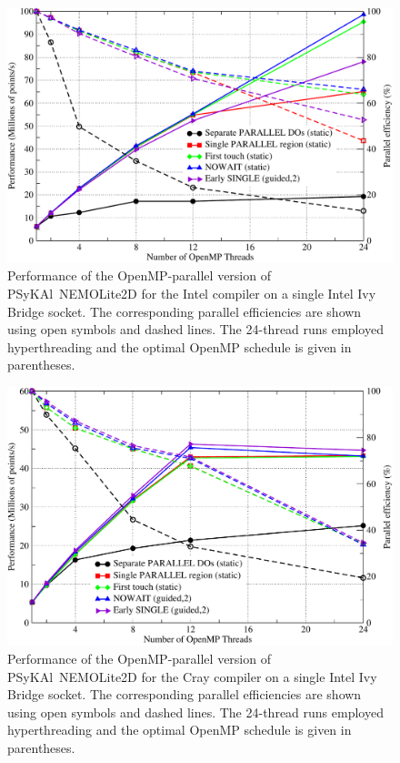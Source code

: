 \documentclass[journal]{IEEEtran}
\newlength{\picwidth}
\newcommand{\psykal}{{PS}y{KA}l}
\begin{document}
\begin{figure}
\centering
\includegraphics[width=\picwidth]{omp_scaling_256_intel}
\caption{Performance of the OpenMP-parallel version of \psykal\
  NEMOLite2D for the Intel compiler on a single Intel Ivy Bridge
  socket.  The corresponding parallel efficiencies are shown using
  open symbols and dashed lines. The 24-thread runs employed
  hyperthreading and the optimal OpenMP schedule is given in
  parentheses.}
\label{FIG_intel_omp_256}
\end{figure}

\begin{figure}
\centering
\includegraphics[width=\picwidth]{omp_scaling_256_cray}
\caption{Performance of the OpenMP-parallel version of \psykal\
  NEMOLite2D for the Cray compiler on a single Intel Ivy Bridge
  socket.  The corresponding parallel efficiencies are shown using
  open symbols and dashed lines. The 24-thread runs employed
  hyperthreading and the optimal OpenMP schedule is given in
  parentheses.}
\label{FIG_cray_omp_256}
\end{figure}
\end{document}
